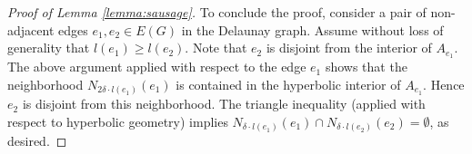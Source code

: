 \documentclass{amsart}
\newcommand{\HH}{\mathbb{H}}
\newcommand{\DelanComplex}{\mathcal{DT}}
\theoremstyle{plain}
\numberwithin{equation}{section}
\theoremstyle{definition}
\begin{document}
\begin{proof}[Proof of Lemma \ref{lemma:sausage}]
To conclude the proof, consider a pair of non-adjacent edges $e_1,e_2 \in E(G)$ in the Delaunay graph. Assume without loss of generality that $l(e_1)\ge l(e_2)$.
Note that $e_2$ is disjoint from the interior of $A_{e_1}$.
The above argument applied with respect to the edge $e_1$ shows that the neighborhood $ N_{2\delta \cdot l(e_1)}(e_1)$ is contained in the hyperbolic interior of $A_{e_1}$. Hence $e_2$ is disjoint from this neighborhood. The triangle inequality (applied with respect to hyperbolic geometry) implies $N_{\delta\cdot l(e_1)}(e_1) \cap N_{\delta\cdot l(e_2)}(e_2) = \emptyset$, as desired.
\end{proof}
\end{document}
